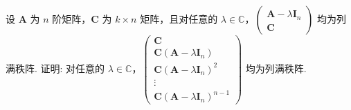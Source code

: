 \documentclass[../../main.tex]{subfiles}
\begin{document}
\begin{example}
设 $\boldsymbol{A}$ 为 $n$ 阶矩阵，$\boldsymbol{C}$ 为 $k\times n$ 矩阵，且对任意的 $\lambda\in\mathbb{C}$，$\begin{pmatrix}
\boldsymbol{A}-\lambda\boldsymbol{I}_n \\
\boldsymbol{C}
\end{pmatrix}$ 均为列满秩阵. 证明: 对任意的 $\lambda\in\mathbb{C}$，$\begin{pmatrix}
\boldsymbol{C} \\
\boldsymbol{C}(\boldsymbol{A}-\lambda\boldsymbol{I}_n) \\
\boldsymbol{C}(\boldsymbol{A}-\lambda\boldsymbol{I}_n)^2 \\
\vdots \\
\boldsymbol{C}(\boldsymbol{A}-\lambda\boldsymbol{I}_n)^{n - 1}
\end{pmatrix}$ 均为列满秩阵.
\end{example}
\end{document}
